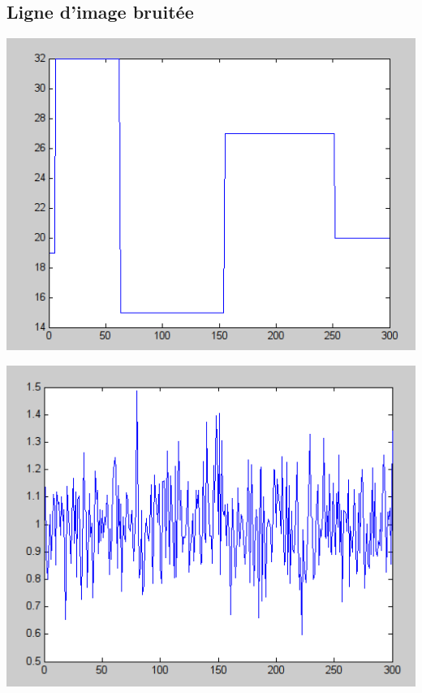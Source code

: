 \documentclass{beamer}
\begin{document}
\begin{frame}
\subsection{Ligne d'image bruitée}
\begin{center}
\includegraphics[scale=0.5]{capture/A.png}
\end{center}
\end{frame}

\begin{frame}
\begin{center}
\includegraphics[scale=0.5]{capture/B.png}
\end{center}
\end{frame}
\end{document}
